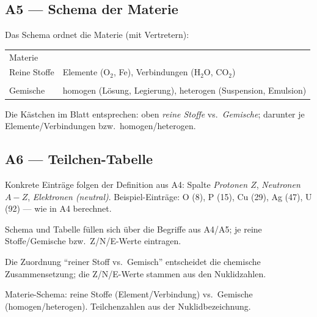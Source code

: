 
\subsection*{A5 — Schema der Materie}
Das Schema ordnet die Materie (mit Vertretern):
\begin{center}
\begin{tabular}{ll}
Materie & \\
\quad Reine Stoffe & Elemente (O$_2$, Fe), Verbindungen (H$_2$O, CO$_2$) \\
\quad \\Gemische & homogen (Lösung, Legierung), heterogen (Suspension, Emulsion)
\end{tabular}
\end{center}
Die Kästchen im Blatt entsprechen: oben \emph{reine Stoffe} vs.\
\emph{Gemische}; darunter je Elemente/Verbindungen bzw.\ homogen/heterogen.

\subsection*{A6 — Teilchen-Tabelle}
Konkrete Einträge folgen der Definition aus A4: Spalte \emph{Protonen $Z$},
\emph{Neutronen $A-Z$}, \emph{Elektronen (neutral)}. Beispiel-Einträge:
O (8), P (15), Cu (29), Ag (47), U (92) — wie in A4 berechnet.

\begin{ergebnis}
Schema und Tabelle füllen sich über die Begriffe aus A4/A5; je reine
Stoffe/Gemische bzw.\ Z/N/E-Werte eintragen.
\end{ergebnis}

\begin{kontrolle}
Die Zuordnung ``reiner Stoff vs.\ Gemisch'' entscheidet die chemische
Zusammensetzung; die Z/N/E-Werte stammen aus den Nuklidzahlen.
\end{kontrolle}

\begin{merksatz}
Materie-Schema: reine Stoffe (Element/Verbindung) vs.\ Gemische
(homogen/heterogen). Teilchenzahlen aus der Nuklidbezeichnung.
\end{merksatz}
